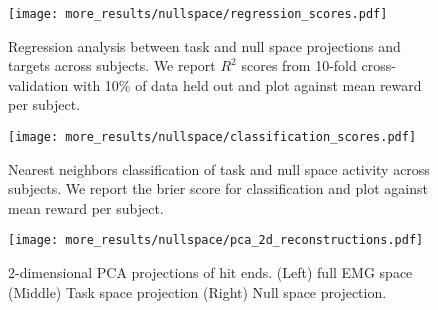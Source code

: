 \documentclass[../main.tex]{subfiles}
\begin{document}
  
  
  \begin{figure}[H]%
    \centering
    \texttt{[image: more\_results/nullspace/regression\_scores.pdf]}
    \caption[Regression task and null space against targets]{Regression analysis between task and null space projections and targets across subjects. We report $R^2$ scores from 10-fold cross-validation with 10\% of data held out and plot against mean reward per subject.}\label{fig:regression_scores}
  \end{figure}
  
  \begin{figure}[H]%
    \centering
    \texttt{[image: more\_results/nullspace/classification\_scores.pdf]}
    \caption[Nearest neighbors classification of task and null space]{Nearest neighbors classification of task and null space activity across subjects. We report the brier score for classification and plot against mean reward per subject.}\label{fig:classification_scores}
  \end{figure}
  
  \begin{figure}[H]%
    \centering
    \texttt{[image: more\_results/nullspace/pca\_2d\_reconstructions.pdf]}
    \caption[PCA projections of null and task space activity]{2-dimensional PCA projections of hit ends. (Left) full EMG space (Middle) Task space projection (Right) Null space projection.}\label{fig:pca_null}
  \end{figure}
  
\end{document}

